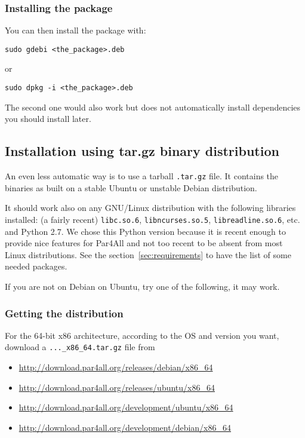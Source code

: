 \documentclass[a4paper]{article}
\begin{document}
\subsubsection{Installing the package}
You can then install the package with:
\begin{verbatim}
sudo gdebi <the_package>.deb
\end{verbatim}
or
\begin{verbatim}
sudo dpkg -i <the_package>.deb
\end{verbatim}

The second one would also work but does not
automatically install dependencies you should install later.


\subsection{Installation using tar.gz binary distribution}

An even less automatic way is to use a tarball \texttt{.tar.gz} file. It
contains the binaries as built on a stable Ubuntu or unstable Debian
distribution.

It should work also on any GNU/Linux distribution with the following
libraries installed: (a fairly recent) \texttt{libc.so.6},
\texttt{libncurses.so.5}, \texttt{libreadline.so.6}, etc. and Python
2.7. We chose this Python version because it is recent enough to provide
nice features for Par4All and not too recent to be absent from most Linux
distributions. See the section~\ref{sec:requirements} to have the list of
some needed packages.

If you are not on Debian on Ubuntu, try one of the following, it may work.


\subsubsection{Getting the distribution}

For the 64-bit x86 architecture, according to the OS and version you want,
download a \texttt{...\_x86\_64.tar.gz} file from

\begin{itemize}
\item \protect\url{http://download.par4all.org/releases/debian/x86_64}
\item \protect\url{http://download.par4all.org/releases/ubuntu/x86_64}
\item \protect\url{http://download.par4all.org/development/ubuntu/x86_64}
\item \protect\url{http://download.par4all.org/development/debian/x86_64}
\end{itemize}
\end{document}
